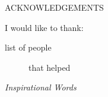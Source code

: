 \newpage
{}

\begin{center}
ACKNOWLEDGEMENTS
\end{center}

\noindent I would like to thank:
\begin{description}
\item[list of people]
  that helped
\end{description}

\begin{flushright}
  \textit{Inspirational Words}
\end{flushright}
